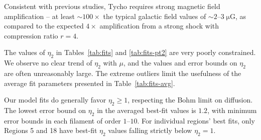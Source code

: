 \documentclass[iop, apj, numberedappendix]{emulateapj}
\newcommand*{\mt}{\mathrm}
\newcommand*{\unit}[1]{\;\mt{#1}}  %
\newcommand*{\abt}{\mathord{\sim}} %
\newcommand*{\Ecut}{E_{\mt{cut}}}
\newcommand*{\muG}{\unit{\mu G}}
\begin{document}
Consistent with previous studies, Tycho requires strong magnetic field
amplification -- at least $\abt 100\times$ the typical galactic field values of
$\abt 2$--$3 \muG$, as compared to the expected $4\times$ amplification from a
strong shock with compression ratio $r=4$.




The values of $\eta_2$ in Tables~\ref{tab:fits} and \ref{tab:fits-pt2} are very
poorly constrained.  We observe no clear trend of $\eta_2$ with $\mu$, and the
values and error bounds on $\eta_2$ are often unreasonably large.  The extreme
outliers limit the usefulness of the average fit parameters presented in
Table~\ref{tab:fits-avg}.

Our model fits do generally favor $\eta_2 \geq 1$, respecting the Bohm limit on
diffusion.  The lowest error bound on $\eta_2$ in the averaged best-fit values
is $1.2$, with minimum error bounds in each filament of order $1$--$10$.  For
individual regions' best fits, only Regions 5 and 18 have best-fit $\eta_2$
values falling strictly below $\eta_2 = 1$.  
\end{document}
